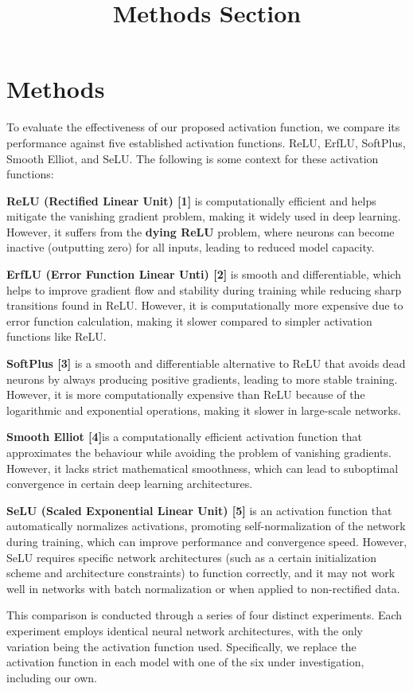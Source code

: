 \documentclass{article}
\title{Methods Section}
\begin{document}
\section{Methods}

To evaluate the effectiveness of our proposed activation function, we compare its performance against five established activation functions. ReLU, ErfLU, SoftPlus, Smooth Elliot, and SeLU. 
 The following is some context for these activation functions: 
 
 \textbf{   ReLU (Rectified Linear Unit) [1]} is computationally efficient and helps mitigate the vanishing gradient problem, making it widely used in deep learning. However, it suffers from the \textbf{dying ReLU} problem, where neurons can become inactive (outputting zero) for all inputs, leading to reduced model capacity. 
 
 \textbf{   ErfLU (Error Function Linear Unti) [2]} is smooth and differentiable, which helps to improve gradient flow and stability during training while reducing sharp transitions found in ReLU. However, it is computationally more expensive due to error function calculation, making it slower compared to simpler activation functions like ReLU.
 
 \textbf{   SoftPlus [3]} is a smooth and differentiable alternative to ReLU that avoids dead neurons by always producing positive gradients, leading to more stable training. However, it is more computationally expensive than ReLU because of the logarithmic and exponential operations, making it slower in large-scale networks. 
 
 \textbf{   Smooth Elliot [4]}is a computationally efficient activation function that approximates the behaviour while avoiding the problem of vanishing gradients. However, it lacks strict mathematical smoothness, which can lead to suboptimal convergence in certain deep learning architectures. 
 
      \textbf{   SeLU (Scaled Exponential Linear Unit) [5]} is an activation function that automatically normalizes activations, promoting self-normalization of the network during training, which can improve performance and convergence speed. However, SeLU requires specific network architectures (such as a certain initialization scheme and architecture constraints) to function correctly, and it may not work well in networks with batch normalization or when applied to non-rectified data. 

 This comparison is conducted through a series of four distinct experiments. Each experiment employs identical neural network architectures, with the only variation being the activation function used. Specifically, we replace the activation function in each model with one of the six under investigation, including our own.
\end{document}
